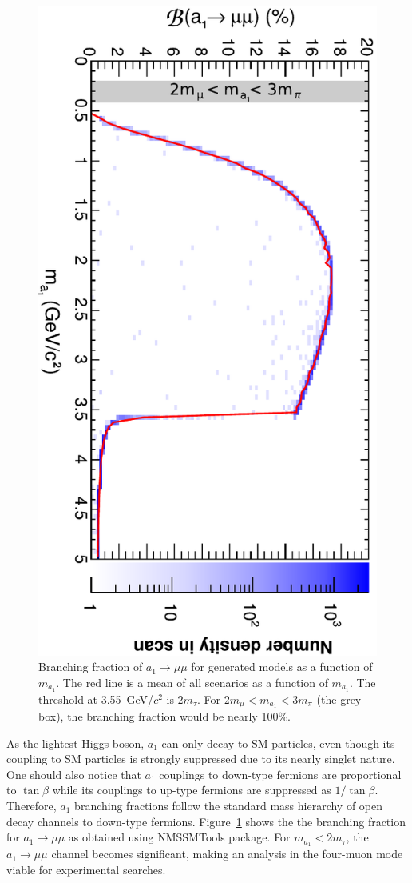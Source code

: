 \documentclass[aps,prl,twocolumn,nofootinbib,superscriptaddress]{revtex4}
\begin{document}
\begin{figure}[htb]
\includegraphics[height=0.95\linewidth, angle=90]{plots/bra_vs_ma}
\caption{Branching fraction of $a_1 \to \mu \mu$ for generated models
  as a function of $m_{a_1}$.  The red line is a mean of all scenarios
  as a function of $m_{a_1}$.  The threshold at 3.55~GeV/$c^2$ is $2m_\tau$.
  For $2m_\mu < m_{a_1} < 3m_\pi$ (the grey box), the branching
  fraction would be nearly 100\%. \label{fig:bramm}}
\end{figure}

As the lightest Higgs boson, $a_1$ can only decay to SM particles,
even though its coupling to SM particles is strongly suppressed due to
its nearly singlet nature.  One should also notice that $a_1$
couplings to down-type fermions are proportional to $\tan\beta$ while
its couplings to up-type fermions are suppressed as $1/\tan\beta$.
Therefore, $a_1$ branching fractions follow the standard mass
hierarchy of open decay channels to down-type fermions.
Figure~\ref{fig:bramm} shows the the branching fraction for $a_1 \to
\mu\mu$ as obtained using NMSSMTools package.  For $m_{a_1} <
2m_\tau$, the $a_1 \to \mu\mu$ channel becomes significant, making an
analysis in the four-muon mode viable for experimental searches.
\end{document}
